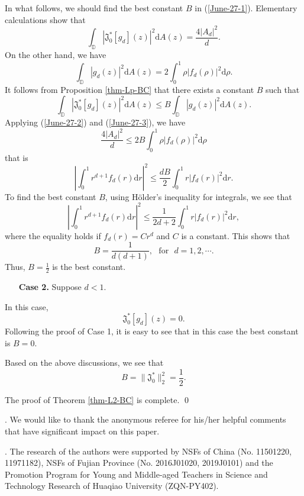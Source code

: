 \documentclass[a4paper,12pt]{amsart}
\theoremstyle{definition}
\numberwithin{equation}{section}
\newcommand{\ID}{{\mathbb D}}
\def\be{\begin{equation}}
\def\ee{\end{equation}}
\begin{document}
In what follows, we should find the best constant $B$ in (\ref{June-27-1}). Elementary calculations show that
\be\label{June-27-2}\int_{\ID}|\mathfrak{J}_0^*[g_{d}](z)|^2\mathrm{d}A(z) =\frac{4 |A_d|^2}{d}.\ee
On the other hand, we have
\be\label{June-27-3}\int_{\ID}|g_{d}(z)|^2\mathrm{d}A(z) =2\int_0^1\rho |f_d(\rho)|^2\mathrm{d}\rho.\ee
It follows from Proposition \ref{thm-Lp-BC} that there exists a constant $B$ such that
$$\int_{\ID}|\mathfrak{J}_0^*[g_d](z)|^2\mathrm{d}A(z) \leq B\int_{\ID}|g_{d}(z)|^2\mathrm{d}A(z) .$$
Applying (\ref{June-27-2}) and (\ref{June-27-3}), we have
$$\frac{4 |A_d|^2}{d}\leq2 B\int_0^1\rho |f_d(\rho)|^2\mathrm{d}\rho$$
that is
$$\left|\int_0^1r^{d+1}f_d(r)\mathrm{d}r\right|^2\leq\frac{dB}{2}\int_0^1r|f_d(r)|^2\mathrm{d}r.$$
To find the best constant $B$, using H\"older's inequality for integrals, we see that
$$\left|\int_0^1r^{d+1}f_d(r)\mathrm{d}r\right|^2\leq\frac{1}{2d+2}\int_0^1r|f_d(r)|^2\mathrm{d}r,$$
where the equality holds if $f_d(r)=Cr^{d}$ and $C$ is a constant.
This shows that
$$B=\frac{1}{d(d+1)},\ \ \ \mbox{for}\ \ \  d=1, 2, \cdots.$$ Thus,
$B=\frac{1}{2}$
is the best constant.

\begin{itemize}
  \item[{\bf Case 2.}]  Suppose $d<1$.
\end{itemize}
In this case,
$$\mathfrak{J}_0^*[g_d](z)=0.$$
Following the proof of Case 1, it is easy to see that in this case the best constant is $B=0$.

Based on the above discussions, we see that
$$B=\|\mathfrak{J}_0^*\|_{2}^2=\frac{1}{2}.$$

The proof of Theorem \ref{thm-L2-BC} is complete. \qed

\vspace*{5mm}
.
We would like to thank the anonymous referee for his/her helpful comments that have significant impact on this paper.

\vspace*{5mm}
.
The research of the authors were supported by NSFs of China (No. 11501220, 11971182), NSFs of Fujian Province (No. 2016J01020, 2019J0101)
and the Promotion Program for Young and Middle-aged Teachers in Science and Technology Research of Huaqiao University (ZQN-PY402).
\end{document}
